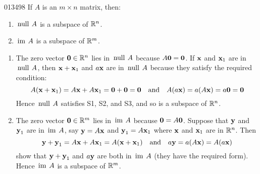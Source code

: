 \begin{example}{}{013498}
If $A$ is an $m \times n$ matrix, then:

\begin{enumerate}
\item $\thinspace\operatorname{null\medspace} A$ is a subspace of $\mathbb{R}^n$.

\item $\thinspace\operatorname{im\medspace} A$ is a subspace of $\mathbb{R}^m$.

\end{enumerate}

\begin{solution}
\begin{enumerate}
\item The zero vector $\textbf{0} \in \mathbb{R}^n$ lies in $\thinspace\operatorname{null\medspace} A$ because $A\textbf{0} = \textbf{0}$.\footnotemark \;  If $\textbf{x}$ and $\textbf{x}_{1}$ are in $\thinspace\operatorname{null\medspace} A$, then $\textbf{x} + \textbf{x}_{1}$ and $a\textbf{x}$ are in $\thinspace\operatorname{null\medspace} A$ because they satisfy the required condition:
\begin{equation*}
A(\textbf{x} + \textbf{x}_1) = A\textbf{x} + A\textbf{x}_1 = \textbf{0} + \textbf{0} = \textbf{0} \quad \mbox{and} \quad A(a\textbf{x}) = a(A\textbf{x}) = a\textbf{0} = \textbf{0}
\end{equation*}
Hence $\thinspace\operatorname{null\medspace} A$ satisfies S1, S2, and S3, and so is a subspace of $\mathbb{R}^n$.

\item The zero vector $\textbf{0} \in \mathbb{R}^m$ lies in $\thinspace\operatorname{im\medspace} A$ because $\textbf{0} = A\textbf{0}$. Suppose that $\textbf{y}$ and $\textbf{y}_{1}$ are in $\thinspace\operatorname{im\medspace} A$, say $\textbf{y} = A\textbf{x}$ and $\textbf{y}_{1} = A\textbf{x}_{1}$ where $\textbf{x}$ and $\textbf{x}_{1}$ are in $\mathbb{R}^n$. Then
\begin{equation*}
\textbf{y} + \textbf{y}_1 = A\textbf{x} + A\textbf{x}_1 = A(\textbf{x} + \textbf{x}_1) \quad \mbox{and} \quad a\textbf{y} = a(A\textbf{x}) = A(a\textbf{x})
\end{equation*}
show that $\textbf{y} + \textbf{y}_{1}$ and $a\textbf{y}$ are both in $\thinspace\operatorname{im\medspace} A$ (they have the required form). Hence $\thinspace\operatorname{im\medspace} A$ is a subspace of $\mathbb{R}^m$.

\end{enumerate}
\end{solution}
\end{example}

